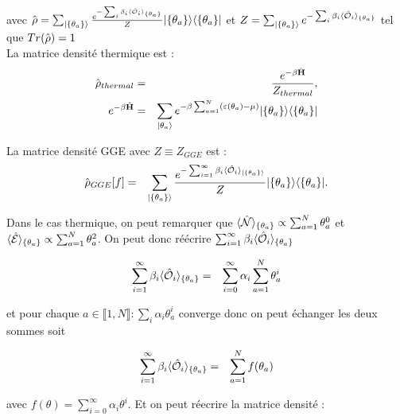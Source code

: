 	avec $\hat{\mathbf{\rho}} = \sum_{\vert \{\theta_a \} \rangle }\frac{e^{-\sum_i \beta_i \langle \hat{\mathbf{\mathcal{O}}}_i \rangle_{\{\theta_a \}} }}{Z} \vert \{\theta_a \}  \rangle   	\langle \{\theta_a \} \vert $ et $Z = \sum_{\vert \{\theta_a \} \rangle }e^{-\sum_i \beta_i \langle \hat{\mathbf{\mathcal{O}}}_i \rangle_{ \{\theta_a \} } } $ tel que $Tr (  \hat{\mathbf{\rho}}) = 1 $\\
	
	La matrice densité thermique est :
	\begin{eqnarray}
		\hat{\mathbf{\rho}}_{thermal} & = & \frac{e^{- \beta \hat{\mathbf{H}}}}{Z_{thermal}}, \\
		e^{-\beta \hat{\mathbf{H}}} & = & 	\sum_{\vert \theta_a \rangle} e^{- \beta \sum_{a=1}^N ( \varepsilon(\theta_a)- \mu ) } \vert \{ \theta_a\} \rangle \langle  \{ \theta_a\}  \vert 
	\end{eqnarray}


La matrice densité GGE avec $Z \equiv Z_{GGE}$ est :
	\begin{eqnarray}
		\hat{\mathbf{\rho}}_{GGE}[f] & = & \sum_{\vert \{\theta_a \} \rangle }\frac{e^{-\sum_{i = 1}^\infty  \beta_i \langle \hat{\mathbf{\mathcal{O}}}_i \rangle_{\vert \{\theta_a \} \rangle} }}{Z} \vert \{\theta_a \}  \rangle   	\langle \{\theta_a \} \vert. 
	\end{eqnarray}
	
	Dans le cas thermique, on peut remarquer que $\langle \hat{\mathbf{\mathcal{N}}} \rangle_{\{ \theta_a\} } \propto \sum_{a = 1}^N \theta_a^0 $ et $\langle \hat{\mathbf{\mathcal{E}}} \rangle_{\{ \theta_a\} } \propto \sum_{a = 1}^N \theta_a^2 $. On peut donc réécrire $\sum_{i = 1}^\infty  \beta_i \langle \hat{\mathbf{\mathcal{O}}}_i \rangle_{ \{\theta_a \} }$
	
	\begin{eqnarray}
		\sum_{i = 1}^\infty  \beta_i \langle \hat{\mathbf{\mathcal{O}}}_i \rangle_{ \{\theta_a \} } & = & \sum_{i = 0}^\infty \alpha_i \sum_{a = 1 }^N \theta_a^i		
	\end{eqnarray}
	
	et pour chaque $a \in \llbracket 1 , N  \rrbracket \colon \sum_i \alpha_i \theta_a^i$ converge donc on peut échanger les deux sommes soit 
	
	\begin{eqnarray}
		\sum_{i = 1}^\infty  \beta_i \langle \hat{\mathbf{\mathcal{O}}}_i \rangle_{ \{\theta_a \} } & = & \sum_{a = 1 }^N  f(\theta_a) 
	\end{eqnarray}
	
	avec $f(\theta) =  \sum_{i = 0}^\infty \alpha_i  \theta^i$.	 Et on peut réecrire la matrice densité  :
	
